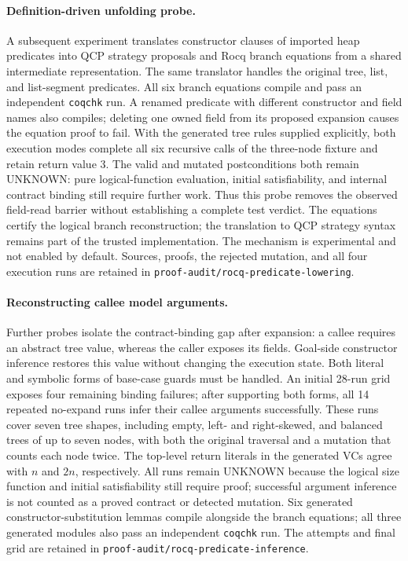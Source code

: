 \paragraph{Definition-driven unfolding probe.}
A subsequent experiment translates constructor clauses of imported heap
predicates into QCP strategy proposals and Rocq branch equations from a shared
intermediate representation. The same translator handles the original tree,
list, and list-segment predicates. All six branch equations compile and pass
an independent \texttt{coqchk} run. A renamed predicate with different
constructor and field names also compiles; deleting one owned field from its
proposed expansion causes the equation proof to fail. With the generated tree
rules supplied explicitly, both execution modes complete all six recursive
calls of the three-node fixture and retain return value 3. The valid and
mutated postconditions both remain UNKNOWN: pure logical-function evaluation,
initial satisfiability, and internal contract binding still require further
work. Thus this probe removes the observed field-read barrier without
establishing a complete test verdict. The equations certify the logical branch
reconstruction; the translation to QCP strategy syntax remains part of the
trusted implementation. The mechanism is experimental and not enabled by
default. Sources, proofs, the rejected mutation, and all four execution runs
are retained in \texttt{proof-audit/rocq-predicate-lowering}.

\paragraph{Reconstructing callee model arguments.}
Further probes isolate the contract-binding gap after expansion: a callee
requires an abstract tree value, whereas the caller exposes its fields.
Goal-side constructor inference restores this value without changing the
execution state. Both literal and symbolic forms of base-case guards must be
handled. An initial 28-run grid exposes four remaining binding failures;
after supporting both forms, all 14 repeated no-expand runs infer their
callee arguments successfully. These runs cover seven tree shapes, including
empty, left- and right-skewed, and balanced trees of up to seven nodes, with
both the original traversal and a mutation that counts each node twice.
The top-level return literals in the generated VCs agree with $n$ and $2n$,
respectively. All runs remain UNKNOWN because the logical size function and
initial satisfiability still require proof; successful argument inference
is not counted as a proved contract or detected mutation. Six generated
constructor-substitution lemmas compile alongside the branch equations; all
three generated modules also pass an independent \texttt{coqchk} run.
The attempts and final grid are retained in
\texttt{proof-audit/rocq-predicate-inference}.


